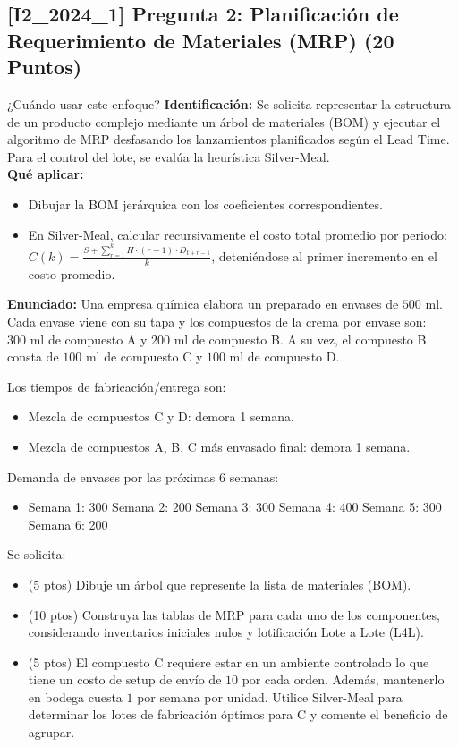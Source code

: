 \documentclass[11pt, a4paper]{article}
\begin{document}
\subsection*{[I2_2024_1] Pregunta 2: Planificación de Requerimiento de Materiales (MRP) (20 Puntos)}
\begin{tipprueba}{¿Cuándo usar este enfoque?}
    \textbf{Identificación:} Se solicita representar la estructura de un producto complejo mediante un árbol de materiales (BOM) y ejecutar el algoritmo de MRP desfasando los lanzamientos planificados según el Lead Time. Para el control del lote, se evalúa la heurística Silver-Meal.\\
    \textbf{Qué aplicar:}
    \begin{itemize}
      \item Dibujar la BOM jerárquica con los coeficientes correspondientes.
      \item En Silver-Meal, calcular recursivamente el costo total promedio por periodo: $C(k) = \frac{S + \sum_{r=1}^{k} H \cdot (r-1) \cdot D_{t+r-1}}{k}$, deteniéndose al primer incremento en el costo promedio.
    \end{itemize}
  \end{tipprueba}

  \textbf{Enunciado:}
  Una empresa química elabora un preparado en envases de $500\text{ ml}$. Cada envase viene con su tapa y los compuestos de la crema por envase son: $300\text{ ml}$ de compuesto A y $200\text{ ml}$ de compuesto B. A su vez, el compuesto B consta de $100\text{ ml}$ de compuesto C y $100\text{ ml}$ de compuesto D.

  Los tiempos de fabricación/entrega son:
  \begin{itemize}
    \item Mezcla de compuestos C y D: demora 1 semana.
    \item Mezcla de compuestos A, B, C más envasado final: demora 1 semana.
  \end{itemize}
  
  Demanda de envases por las próximas 6 semanas:
  \begin{itemize}
    \item Semana 1: 300 \quad Semana 2: 200 \quad Semana 3: 300 \quad Semana 4: 400 \quad Semana 5: 300 \quad Semana 6: 200
  \end{itemize}

  Se solicita:
  \begin{itemize}
    \item[\textbf{i.}] (5 ptos) Dibuje un árbol que represente la lista de materiales (BOM).
    \item[\textbf{ii.}] (10 ptos) Construya las tablas de MRP para cada uno de los componentes, considerando inventarios iniciales nulos y lotificación Lote a Lote (L4L).
    \item[\textbf{iii.}] (5 ptos) El compuesto C requiere estar en un ambiente controlado lo que tiene un costo de setup de envío de $10$ por cada orden. Además, mantenerlo en bodega cuesta $1$ por semana por unidad. Utilice Silver-Meal para determinar los lotes de fabricación óptimos para C y comente el beneficio de agrupar.
  \end{itemize}
\end{document}
